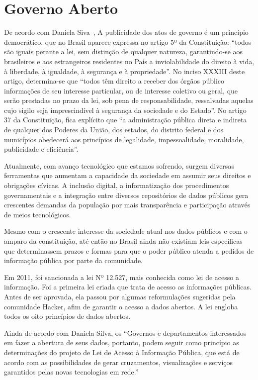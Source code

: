 \chapter{Governo Aberto}

De acordo com Daniela Siva~\cite{silva}, A publicidade dos atos de governo é um princípio democrático, que no Brasil aparece expressa no artigo 5º da Constituição: “todos são iguais perante a lei, sem distinção de qualquer natureza, garantindo-se aos brasileiros e aos estrangeiros residentes no País a inviolabilidade do direito à vida, à liberdade, à igualdade, à segurança e à propriedade”. No inciso XXXIII deste artigo, determina-se que “todos têm direito a receber dos órgãos público informações de seu interesse particular, ou de interesse coletivo ou geral, que serão prestadas no prazo da lei, sob pena de responsabilidade, ressalvadas aquelas cujo sigilo seja imprescindível à segurança da sociedade e do Estado”. No artigo 37 da Constituição, fica explícito que “a administração pública direta e indireta de qualquer dos Poderes da União, dos estados, do distrito federal e dos municípios obedecerá aos princípios de legalidade, impessoalidade, moralidade, publicidade e eficiência”. 

Atualmente, com avanço tecnológico que estamos sofrendo, surgem diversas ferramentas que aumentam a capacidade da sociedade em assumir seus direitos e obrigações cívicas. A inclusão digital, a informatização dos procedimentos governamentais e a integração entre diversos repositórios de dados públicos gera crescentes demandas da população por mais transparência e participação através de meios tecnológicos.

Mesmo com o crescente interesse da sociedade atual nos dados públicos e com o amparo da constituição, até então no Brasil ainda não existiam leis específicas que determinassem prazos e formas para que o poder público atenda a pedidos de informação pública por parte da comunidade.

Em 2011, foi sancionada a lei Nº 12.527, mais conhecida como lei de acesso a informação\cite{lai}. Foi a primeira lei criada que trata de acesso as informações públicas. Antes de ser aprovada, ela passou por algumas reformulações sugeridas pela comunidade Hacker, afim de garantir o acesso a dados abertos. A lei engloba todos os oito princípios de dados abertos. 

Ainda de acordo com Daniela Silva\cite{silva}, os “Governos e departamentos interessados em fazer a abertura de seus dados, portanto, podem seguir como princípio as determinações do projeto de Lei de Acesso à Informação Pública, que está de acordo com as possibilidades de gerar cruzamentos, visualizações e serviços garantidos pelas novas tecnologias em rede.”

